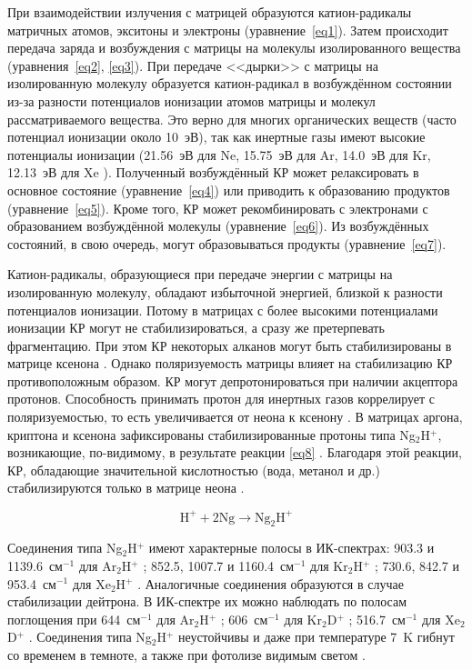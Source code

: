 {При взаимодействии излучения с матрицей образуются катион-радикалы матричных атомов, экситоны и электроны (уравнение~\ref{eq1}).
Затем происходит передача заряда и возбуждения с матрицы на молекулы изолированного вещества (уравнения~\ref{eq2}, \ref{eq3}). При передаче <<дырки>> с матрицы на изолированную молекулу образуется катион-радикал в возбуждённом состоянии из-за разности потенциалов ионизации атомов матрицы и молекул рассматриваемого вещества. Это  верно для многих органических веществ (часто потенциал ионизации около 10~эВ), так как инертные газы имеют высокие потенциалы ионизации (21.56~эВ для Ne, 15.75~эВ для Ar, 14.0~эВ для Kr, 12.13~эВ для Xe \cite{xray}). Полученный возбуждённый КР может релаксировать в основное состояние (уравнение~\ref{eq4}) или приводить к образованию продуктов (уравнение~\ref{eq5}). Кроме того, КР может рекомбинировать с электронами с образованием возбуждённой молекулы (уравнение~\ref{eq6}).  Из возбуждённых состояний, в свою очередь, могут образовываться продукты
(уравнение~\ref{eq7}). 

Катион-радикалы, образующиеся при передаче энергии с матрицы на изолированную молекулу, обладают избыточной энергией, близкой к разности потенциалов ионизации. Потому в матрицах с более высокими потенциалами ионизации КР могут не стабилизироваться, а сразу же претерпевать фрагментацию. При этом КР некоторых алканов могут быть стабилизированы в матрице ксенона \cite{Feldman1999_}. Однако поляризуемость матрицы влияет на стабилизацию КР противоположным образом. КР могут депротонироваться при наличии акцептора протонов. Способность принимать протон для инертных газов коррелирует с поляризуемостью, то есть увеличивается от неона к ксенону \cite{NIST}. В матрицах аргона, криптона и ксенона зафиксированы стабилизированные протоны типа Ng$_2$H$^+$, возникающие, по-видимому, в результате реакции \ref{eq8} \cite{Bondybey1972, Kunttu1992}. Благодаря этой реакции, КР, обладающие значительной кислотностью (вода, метанол и др.) стабилизируются только в матрице неона \cite{Knight1992, Knight1995}.

\begin{equation}\label{eq8}
\mathrm{
H^+ + 2Ng \to Ng_2H^+}
\end{equation}

 Соединения типа Ng$_2$H$^+$ имеют характерные полосы в ИК-спектрах:  903.3 и 1139.6~см$^{-1}$ для Ar$_2$H$^+$ \cite{Bondybey1972};  852.5, 1007.7 и 1160.4~см$^{-1}$ для Kr$_2$H$^+$ \cite{Bondybey1972};  730.6, 842.7 и 953.4~см$^{-1}$ для Xe$_2$H$^+$ \cite{Kunttu1992}. Аналогичные соединения образуются в случае стабилизации дейтрона. В ИК-спектре их можно наблюдать по полосам поглощения при 644~см$^{-1}$ для Ar$_2$H$^+$ \cite{Bondybey1972}; 606~см$^{-1}$ для  Kr$_2$D$^+$ \cite{Bondybey1972}; 516.7~см$^{-1}$ для  Xe$_2$D$^+$ \cite{Kunttu1992}. Соединения типа Ng$_2$H$^+$ неустойчивы и даже при температуре 7~K гибнут со временем в темноте, а также при фотолизе видимым светом \cite{Bondybey1972}.


}
